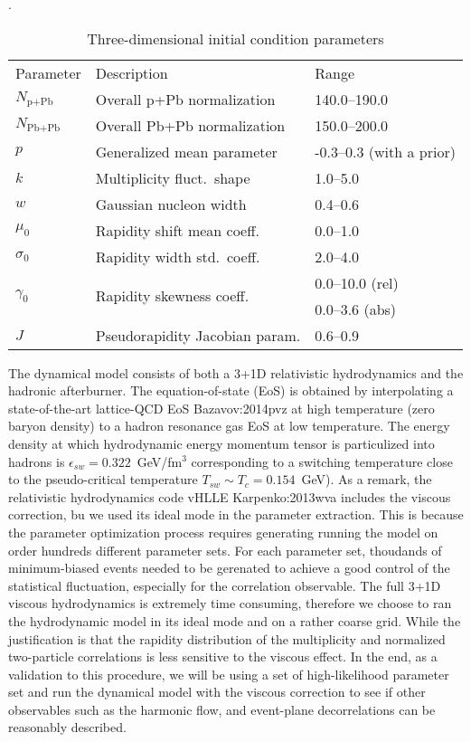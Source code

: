 \begin{table}
\centering
\caption{Three-dimensional initial condition parameters}
\label{tab:trento:parameters}.
\begin{tabular}{lll}
      Parameter & Description	& Range \\
      \paddedhline
      $N_{\textrm{p+Pb}}$    & Overall p+Pb normalization      & 140.0--190.0 \\
      $N_{\textrm{Pb+Pb}}$   & Overall Pb+Pb normalization     & 150.0--200.0  \\
      $p$	                   & Generalized mean parameter      & -0.3--0.3 (with a prior)  \\
      $k$	                   & Multiplicity fluct.\ shape      & 1.0--5.0  \\
      $w$	                   & Gaussian nucleon width     & 0.4--0.6  \\
      $\mu_0$                & Rapidity shift mean coeff.\     & 0.0--1.0  \\
      $\sigma_0$             & Rapidity width std.\ coeff.\    & 2.0--4.0  \\
      \multirow{2}{*}{$\gamma_0$}             & \multirow{2}{*}{Rapidity skewness coeff.\ }      & 0.0--10.0 (rel) \\
                  &        & 0.0--3.6 (abs)  \\
      $J$	                   & Pseudorapidity Jacobian param.  & 0.6--0.9
\end{tabular}  
\end{table}

The dynamical model consists of both a 3+1D relativistic hydrodynamics and the hadronic afterburner.
The equation-of-state (EoS) is obtained by interpolating a state-of-the-art lattice-QCD EoS {Bazavov:2014pvz} at high temperature (zero baryon density) to a hadron resonance gas EoS at low temperature.
The energy density at which hydrodynamic energy momentum tensor is particulized into hadrons is $\epsilon_{sw} = 0.322$~GeV/fm$^3$ corresponding to a switching temperature close to the pseudo-critical temperature $T_{sw} \sim T_c = 0.154$~GeV).
As a remark, the relativistic hydrodynamics code \mbox{vHLLE} {Karpenko:2013wva} includes the viscous correction, bu we used its ideal mode in the parameter extraction.
This is because the parameter optimization process requires generating running the model on order hundreds different parameter sets.
For each parameter set, thoudands of minimum-biased events needed to be gerenated to achieve a good control of the statistical fluctuation, especially for the correlation observable. 
The full 3+1D viscous hydrodynamics is extremely time consuming, therefore we choose to ran the hydrodynamic model in its ideal mode and on a rather coarse grid.
While the justification is that the rapidity distribution of the multiplicity and normalized two-particle correlations is less sensitive to the viscous effect.
In the end, as a validation to this procedure, we will be using a set of high-likelihood parameter set and run the dynamical model with the viscous correction to see if other observables such as the harmonic flow, and event-plane decorrelations can be reasonably described.


